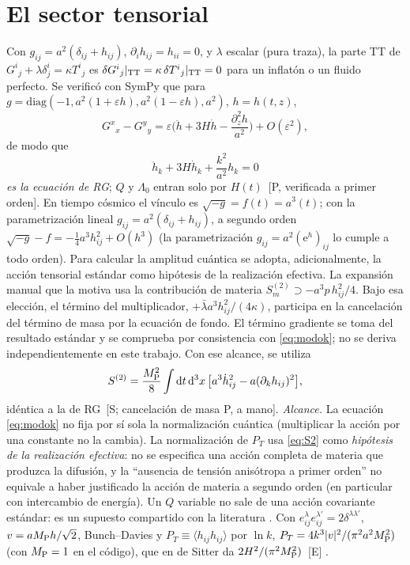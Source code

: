 \documentclass[11pt,a4paper]{article}
\numberwithin{equation}{section}
\newcommand{\MP}{M_{\rm P}}\newcommand{\kap}{\kappa}\newcommand{\Lb}{\bar\lambda}\newcommand{\dd}{\mathrm d}\newcommand{\ee}{\mathrm e}
\newcommand{\etq}[1]{\,{\footnotesize\color{gray}[#1]}}
\begin{document}
\section{El sector tensorial}
\label{sec:tensores}
Con $g_{ij}=a^2(\delta_{ij}+h_{ij})$, $\partial_ih_{ij}=h_{ii}=0$, y $\lambda$ escalar (pura traza), la parte TT de $G^i{}_j+\lambda\delta^i_j=\kap T^i{}_j$ es $\delta G^i{}_j|_{\rm TT}=\kap\,\delta T^i{}_j|_{\rm TT}=0$ para un inflat\'on o un fluido perfecto. Se verific\'o con SymPy que para $g=\mathrm{diag}(-1,a^2(1+\varepsilon h),a^2(1-\varepsilon h),a^2)$, $h=h(t,z)$,
\begin{equation}
G^x{}_x-G^y{}_y=\varepsilon\Big(\ddot h+3H\dot h-\frac{\partial_z^2h}{a^2}\Big)+O(\varepsilon^2),
\label{eq:GxxGyy}
\end{equation}
de modo que
\begin{equation}
\boxed{\ \ddot h_k+3H\dot h_k+\frac{k^2}{a^2}h_k=0\ }
\label{eq:modok}
\end{equation}
\emph{es la ecuaci\'on de RG}; $Q$ y $\Lambda_0$ entran solo por $H(t)$ \etq{P, verificada a primer orden}. En tiempo c\'osmico el v\'inculo es $\sqrt{-g}=f(t)=a^3(t)$; con la parametrizaci\'on lineal $g_{ij}=a^2(\delta_{ij}+h_{ij})$, a segundo orden $\sqrt{-g}-f=-\tfrac14 a^3h_{ij}^2+O(h^3)$ (la parametrizaci\'on $g_{ij}=a^2(\ee^h)_{ij}$ lo cumple a todo orden). Para calcular la amplitud cuántica se adopta, adicionalmente, la acción tensorial estándar como hipótesis de la realización efectiva. La expansión manual que la motiva usa la contribución de materia $S_m^{(2)}\supset-a^3p\,h_{ij}^2/4$. Bajo esa elección, el término del multiplicador, $+\bar\lambda a^3h_{ij}^2/(4\kap)$, participa en la cancelación del término de masa por la ecuación de fondo. El término gradiente se toma del resultado estándar y se comprueba por consistencia con \eqref{eq:modok}; no se deriva independientemente en este trabajo. Con ese alcance, se utiliza
\begin{equation}
S^{(2)}=\frac{\MP^2}{8}\int\dd t\,\dd^3x\,\big[a^3\dot h_{ij}^2-a(\partial_kh_{ij})^2\big],
\label{eq:S2}
\end{equation}
idéntica a la de RG \etq{S; cancelación de masa P, a mano}. \emph{Alcance.} La ecuaci\'on \eqref{eq:modok} no fija por s\'i sola la normalizaci\'on cu\'antica (multiplicar la acci\'on por una constante no la cambia). La normalizaci\'on de $P_T$ usa \eqref{eq:S2} como \emph{hip\'otesis de la realizaci\'on efectiva}: no se especifica una acci\'on completa de materia que produzca la difusi\'on, y la ``ausencia de tensi\'on anis\'otropa a primer orden'' no equivale a haber justificado la acci\'on de materia a segundo orden (en particular con intercambio de energ\'ia). Un $Q$ variable no sale de una acci\'on covariante est\'andar: es un supuesto compartido con la literatura \cite{fabris22}. Con $e^\lambda_{ij}e^{\lambda'}_{ij}=2\delta^{\lambda\lambda'}$, $v=a\MP h/\sqrt2$, Bunch--Davies y $P_T\equiv\langle h_{ij}h_{ij}\rangle$ por $\ln k$, $P_T=4k^3|v|^2/(\pi^2a^2\MP^2)$ (con $\MP=1$ en el c\'odigo), que en de Sitter da $2H^2/(\pi^2\MP^2)$ \etq{E} \cite{baumann22}.
\end{document}
